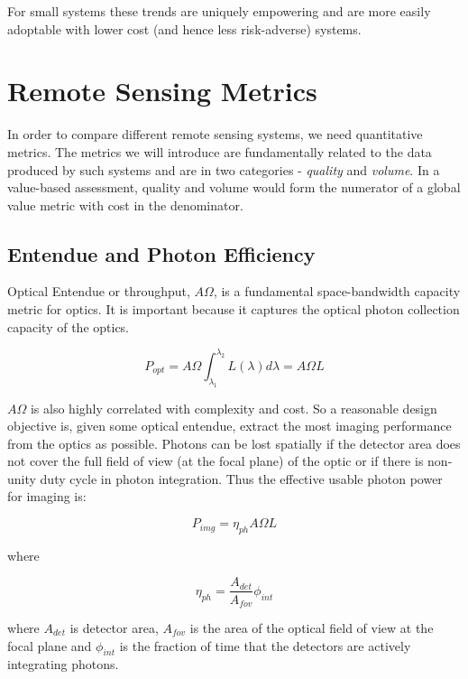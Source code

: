 \documentclass[10pt,journal]{IEEEtran}  %
\begin{document}
For small systems these trends are uniquely empowering and are more easily adoptable with lower cost (and hence less risk-adverse) systems.

\section{Remote Sensing Metrics}
\label{sec:Metrics}
In order to compare different remote sensing systems, we need quantitative metrics.  The metrics we will introduce are fundamentally related to the data produced by such systems and are in two categories - \emph{quality} and \emph{volume}.  In a value-based assessment, quality and volume would form the numerator of a global value metric with cost in the denominator.

\subsection{Entendue and Photon Efficiency}
\label{sec:entendue}

Optical Entendue or throughput, $A \Omega$, is a fundamental space-bandwidth capacity metric for optics.  It is important because it captures the optical photon collection capacity of the optics. 

\begin{equation}
    P_{opt} = A\Omega \int_{\lambda_1}^{\lambda_2}L(\lambda) d\lambda = A\Omega L
\end{equation}

$A\Omega$ is also highly correlated with complexity and cost.  So a reasonable design objective is, given some optical entendue, extract the most imaging performance from the optics as possible.
Photons can be lost spatially if the detector area does not cover the full field of view (at the focal plane) of the optic or if there is non-unity duty cycle in photon integration.  Thus the effective usable photon power for imaging is:

\begin{equation}
    P_{img} = \eta_{ph} A \Omega L 
\end{equation}

where

\begin{equation}
    \eta_{ph} = \frac{A_{det}}{A_{fov}} \phi_{int}
\end{equation}

where $A_{det}$ is detector area, $A_{fov}$ is the area of the optical field of view at the focal plane and $\phi_{int}$ is the fraction of time that the detectors are actively integrating photons.  
\end{document}
